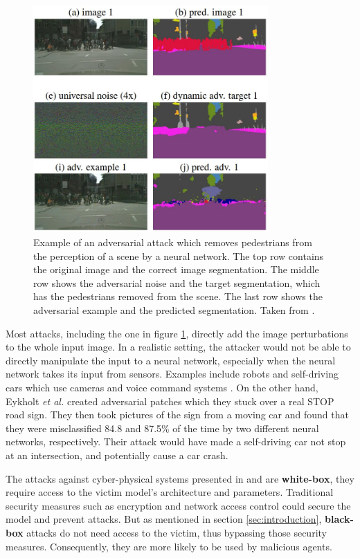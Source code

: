 \begin{figure}[ht]
    \centering
    \includegraphics[width=0.8\textwidth]{graphics/adversarial_segmentation.JPG}
    \caption{Example of an adversarial attack which removes pedestrians from the perception of a scene by a neural network. The top row contains the original image and the correct image segmentation. The middle row shows the adversarial noise and the target segmentation, which has the pedestrians removed from the scene. The last row shows the adversarial example and the predicted segmentation. Taken from \cite{Metzen_2017_ICCV}.}
    \label{fig:adversarial_segmentation}
\end{figure}

Most attacks, including the one in figure \ref{fig:adversarial_segmentation}, directly add the image perturbations to the whole input image. In a realistic setting, the attacker would not be able to directly manipulate the input to a neural network, especially when the neural network takes its input from sensors. Examples include robots and self-driving cars which use cameras and voice command systems \cite{kurakin2016adversarial}. On the other hand, Eykholt \textit{et al.} \cite{evtimov_road_signs} created adversarial patches which they stuck over a real STOP road sign. They then took pictures of the sign from a moving car and found that they were misclassified 84.8 and 87.5\% of the time by two different neural networks, respectively. Their attack would have made a self-driving car not stop at an intersection, and potentially cause a car crash.

The attacks against cyber-physical systems presented in \cite{athalye} and \cite{evtimov_road_signs} are \textbf{white-box}, they require access to the victim model's architecture and parameters. Traditional security measures such as encryption and network access control could secure the model and prevent attacks. But as mentioned in section \ref{sec:introduction}, \textbf{black-box} attacks do not need access to the victim, thus bypassing those security measures. Consequently, they are more likely to be used by malicious agents. 

